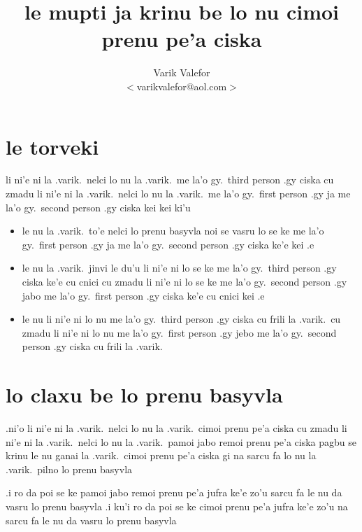 \documentclass{article}
\title{le mupti ja krinu be lo nu cimoi prenu pe'a ciska}
\author{Varik Valefor\\{\small $<$varikvalefor@aol.com$>$}}
\begin{document}
\maketitle
\section{le torveki}
li ni'e ni la .varik.\ nelci lo nu la .varik.\ me la'o gy.\ third person .gy ciska cu zmadu li ni'e ni la .varik.\ nelci lo nu la .varik.\ me la'o gy.\ first person .gy ja me la'o gy.\ second person .gy ciska kei kei ki'u
\begin{itemize}
	\item le nu la .varik.\ to'e nelci lo prenu basyvla noi se vasru lo se ke me la'o gy.\ first person .gy ja me la'o gy.\ second person .gy ciska ke'e kei .e
	\item le nu la .varik.\ jinvi le du'u li ni'e ni lo se ke me la'o gy.\ third person .gy ciska ke'e cu cnici cu zmadu li ni'e ni lo se ke me la'o gy.\ second person .gy jabo me la'o gy.\ first person .gy ciska ke'e cu cnici kei .e
	\item le nu li ni'e ni lo nu me la'o gy.\ third person .gy ciska cu frili la .varik.\ cu zmadu li ni'e ni lo nu me la'o gy.\ first person .gy jebo me la'o gy.\ second person .gy ciska cu frili la .varik.
\end{itemize}
\section{lo claxu be lo prenu basyvla}
.ni'o li ni'e ni la .varik.\ nelci lo nu la .varik.\ cimoi prenu pe'a ciska cu zmadu li ni'e ni la .varik.\ nelci lo nu la .varik.\ pamoi jabo remoi prenu pe'a ciska pagbu se krinu le nu ganai la .varik.\ cimoi prenu pe'a ciska gi na sarcu fa lo nu la .varik.\ pilno lo prenu basyvla

.i ro da poi se ke pamoi jabo remoi prenu pe'a jufra ke'e zo'u sarcu fa le nu da vasru lo prenu basyvla  .i ku'i ro da poi se ke cimoi prenu pe'a jufra ke'e zo'u na sarcu fa le nu da vasru lo prenu basyvla
\end{document}
